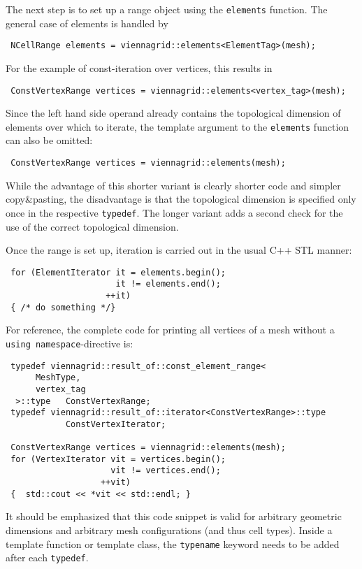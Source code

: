 The next step is to set up a range object using the \lstinline|elements| function.
The general case of elements is handled by
\begin{lstlisting}
 NCellRange elements = viennagrid::elements<ElementTag>(mesh);
\end{lstlisting}
For the example of const-iteration over vertices, this results in
\begin{lstlisting}
 ConstVertexRange vertices = viennagrid::elements<vertex_tag>(mesh);
\end{lstlisting}
Since the left hand side operand already contains the topological dimension of elements over which to iterate,
the template argument to the \lstinline|elements| function can also be omitted:
\begin{lstlisting}
 ConstVertexRange vertices = viennagrid::elements(mesh);
\end{lstlisting}
While the advantage of this shorter variant is clearly shorter code and simpler copy\&pasting, the disadvantage is that the topological dimension is specified only once in the respective \lstinline|typedef|. The longer variant adds a second check for the use of the correct topological dimension.

Once the range is set up, iteration is carried out in the usual C++ STL manner:
\begin{lstlisting}
 for (ElementIterator it = elements.begin();
                      it != elements.end();
                    ++it)
 { /* do something */}
\end{lstlisting}
For reference, the complete code for printing all vertices of a mesh without a \lstinline|using namespace|-directive is:
\begin{lstlisting}
 typedef viennagrid::result_of::const_element_range<
      MeshType,
      vertex_tag
  >::type   ConstVertexRange;
 typedef viennagrid::result_of::iterator<ConstVertexRange>::type
            ConstVertexIterator;

 ConstVertexRange vertices = viennagrid::elements(mesh);
 for (VertexIterator vit = vertices.begin();
                     vit != vertices.end();
                   ++vit)
 {  std::cout << *vit << std::endl; }
\end{lstlisting}
It should be emphasized that this code snippet is valid for arbitrary geometric dimensions and arbitrary mesh configurations (and thus cell types). Inside a template function or template class, the \lstinline|typename| keyword needs to be added after each \lstinline|typedef|.



